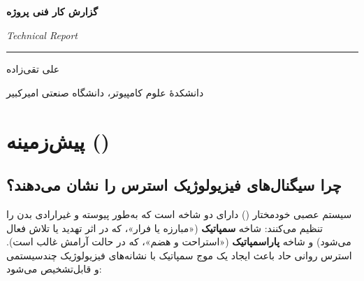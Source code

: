 \documentclass[12pt,a4paper]{article}
\begin{document}
	
\begin{titlepage}
	\centering
	
	\vspace*{2cm}
	
	{\Huge\bfseries گزارش کار فنی پروژه\par}
	\vspace{0.6cm}
	
	{\LARGE\bfseries 
		\href{https://github.com/alitkbbl/PhysioStress}{\textcolor{blue}{}}
		\par}
	
	\vspace{0.5cm}
	{\large\itshape Technical Report\par}
	
	\vspace{0.8cm}
	\rule{\linewidth}{0.4pt}
	\vspace{0.8cm}
	
	{\Large علی تقی‌زاده\par}
	\vspace{0.3cm}
	
	{\large دانشکدهٔ علوم کامپیوتر، دانشگاه صنعتی امیرکبیر\par}
	
	\vfill
	


	
	\vspace*{1.5cm}
\end{titlepage}

	
	\tableofcontents
	\newpage

	\section{پیش‌زمینه ()}
	
	\subsection{چرا سیگنال‌های فیزیولوژیک استرس را نشان می‌دهند؟}
	
	سیستم عصبی خودمختار () دارای دو شاخه است که به‌طور پیوسته و غیرارادی بدن را تنظیم می‌کنند: شاخه \textbf{سمپاتیک} («مبارزه یا فرار»، که در اثر تهدید یا تلاش فعال می‌شود) و شاخه \textbf{پاراسمپاتیک} («استراحت و هضم»، که در حالت آرامش غالب است). استرس روانی حاد باعث ایجاد یک موج سمپاتیک با نشانه‌های فیزیولوژیک چندسیستمی و قابل‌تشخیص می‌شود:
	
\end{document}
